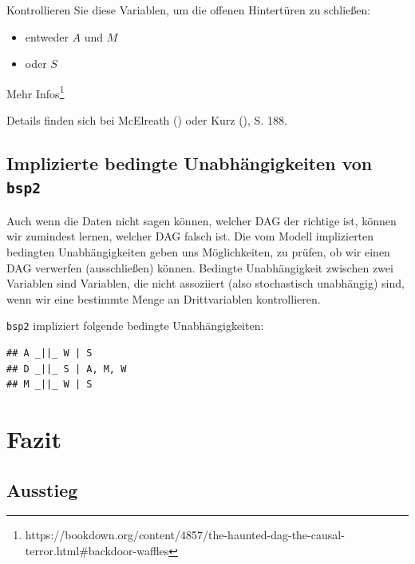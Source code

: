 \documentclass[
  ngerman,
  letterpaper,
  twoside,
  open=any]{scrbook}
\providecommand{\tightlist}{%
  \setlength{\itemsep}{0pt}\setlength{\parskip}{0pt}}\usepackage{longtable,booktabs,array}
\theoremstyle{definition}
\theoremstyle{plain}
\theoremstyle{definition}
\theoremstyle{definition}
\theoremstyle{definition}
\theoremstyle{definition}
\theoremstyle{remark}
\begin{document}
Kontrollieren Sie diese Variablen, um die offenen Hintertüren zu
schließen:

\begin{itemize}
\tightlist
\item
  entweder \(A\) und \(M\)
\item
  oder \(S\)
\end{itemize}

Mehr Infos\footnote{https://bookdown.org/content/4857/the-haunted-dag-the-causal-terror.html\#backdoor-waffles}

Details finden sich bei McElreath ()
oder Kurz (), S. 188.

\subsection{\texorpdfstring{Implizierte bedingte Unabhängigkeiten von
\texttt{bsp2}}{Implizierte bedingte Unabhängigkeiten von bsp2}}\label{implizierte-bedingte-unabhuxe4ngigkeiten-von-bsp2}

Auch wenn die Daten nicht sagen können, welcher DAG der richtige ist,
können wir zumindest lernen, welcher DAG falsch ist. Die vom Modell
implizierten bedingten Unabhängigkeiten geben uns Möglichkeiten, zu
prüfen, ob wir einen DAG verwerfen (ausschließen) können. Bedingte
Unabhängigkeit zwischen zwei Variablen sind Variablen, die nicht
assoziiert (also stochastisch unabhängig) sind, wenn wir eine bestimmte
Menge an Drittvariablen kontrollieren.

\texttt{bsp2} impliziert folgende bedingte Unabhängigkeiten:

\begin{verbatim}
## A _||_ W | S
## D _||_ S | A, M, W
## M _||_ W | S
\end{verbatim}

\section{Fazit}\label{fazit-7}

\subsection{Ausstieg}\label{ausstieg-2}
\end{document}
